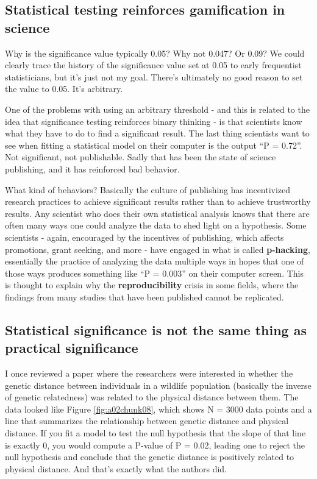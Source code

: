 \documentclass[
]{book}
\begin{document}
\subsection{Statistical testing reinforces gamification in science}\label{statistical-testing-reinforces-gamification-in-science}

Why is the significance value typically 0.05? Why not 0.047? Or 0.09? We could clearly trace the history of the significance value set at 0.05 to early frequentist statisticians, but it's just not my goal. There's ultimately no good reason to set the value to 0.05. It's arbitrary.

One of the problems with using an arbitrary threshold - and this is related to the idea that significance testing reinforces binary thinking - is that scientists know what they have to do to find a significant result. The last thing scientists want to see when fitting a statistical model on their computer is the output ``P = 0.72''. Not significant, not publishable. Sadly that has been the state of science publishing, and it has reinforced bad behavior.

What kind of behaviors? Basically the culture of publishing has incentivized research practices to achieve significant results rather than to achieve trustworthy results. Any scientist who does their own statistical analysis knows that there are often many ways one could analyze the data to shed light on a hypothesis. Some scientists - again, encouraged by the incentives of publishing, which affects promotions, grant seeking, and more - have engaged in what is called \textbf{p-hacking}, essentially the practice of analyzing the data multiple ways in hopes that one of those ways produces something like ``P = 0.003'' on their computer screen. This is thought to explain why the \textbf{reproducibility} crisis in some fields, where the findings from many studies that have been published cannot be replicated.

\subsection{Statistical significance is not the same thing as practical significance}\label{statistical-significance-is-not-the-same-thing-as-practical-significance}

I once reviewed a paper where the researchers were interested in whether the genetic distance between individuals in a wildlife population (basically the inverse of genetic relatedness) was related to the physical distance between them. The data looked like Figure \ref{fig:a02chunk08}, which shows N = 3000 data points and a line that summarizes the relationship between genetic distance and physical distance. If you fit a model to test the null hypothesis that the slope of that line is exactly 0, you would compute a P-value of P = 0.02, leading one to reject the null hypothesis and conclude that the genetic distance is positively related to physical distance. And that's exactly what the authors did.
\end{document}
